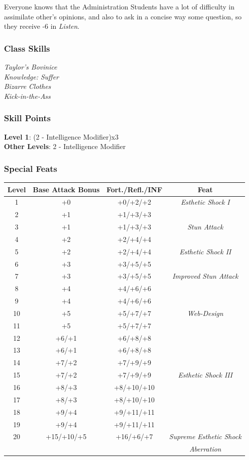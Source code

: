\documentclass[ letterpaper,12pt]{article}
\begin{document}
Everyone knows that the Administration Students have a lot of difficulty in assimilate other's opinions, and also to ask in a concise way some question, so they receive -6 in {\it Listen}.

\subsubsection{Class Skills}
{\it
Taylor's Bovinice\\
Knowledge: Suffer\\
Bizarre Clothes\\
Kick-in-the-Ass\\}

\subsubsection{Skill Points}
{\bf Level 1}: (2 - Intelligence Modifier)x3\\
{\bf Other Levels}: 2 - Intelligence Modifier\\

\subsubsection{Special Feats}

\begin{center} \begin{tabular}{|c||c|c|c|}
\hline
{\bf Level}&{\bf Base Attack Bonus}&{\bf Fort./Refl./INF}&{\bf Feat}\\
\hline
1&+0&+0/+2/+2&{\it Esthetic Shock I}\\
\hline
2&+1&+1/+3/+3&\\
\hline
3&+1&+1/+3/+3&{\it Stun Attack}\\
\hline
4&+2&+2/+4/+4&\\
\hline
5&+2&+2/+4/+4&{\it Esthetic Shock II}\\
\hline
6&+3&+3/+5/+5&\\
\hline
7&+3&+3/+5/+5&{\it Improved Stun Attack}\\
\hline
8&+4&+4/+6/+6&\\
\hline
9&+4&+4/+6/+6&\\
\hline
10&+5&+5/+7/+7&{\it Web-Design}\\
\hline
11&+5&+5/+7/+7&\\
\hline
12&+6/+1&+6/+8/+8&\\
\hline
13&+6/+1&+6/+8/+8&\\
\hline
14&+7/+2&+7/+9/+9&\\
\hline
15&+7/+2&+7/+9/+9&{\it Esthetic Shock III }\\
\hline
16&+8/+3&+8/+10/+10&\\
\hline
17&+8/+3&+8/+10/+10&\\
\hline
18&+9/+4&+9/+11/+11&\\
\hline
19&+9/+4&+9/+11/+11&\\
\hline
20&+15/+10/+5&+16/+6/+7&{\it Supreme Esthetic Shock}\\
&&&{\it Aberration}\\
\hline
\end{tabular} \end{center}
\end{document}
